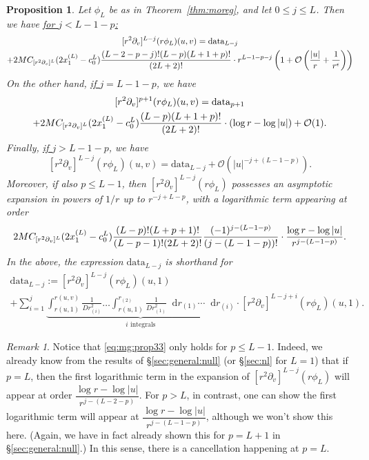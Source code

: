 \documentclass[11pt,english]{article}
\numberwithin{equation}{section}
\theoremstyle{remark}
\newtheorem{rem}{Remark}[section]
\theoremstyle{plain}
\newtheorem{prop}{Proposition}[section]
\theoremstyle{remark}
\newcommand{\dd}{\mathop{}\!\mathrm{d}}
\newcommand{\pv}{\partial_v}
\renewcommand{\(}{\left(}
\renewcommand{\)}{\right)}
\begin{document}
\begin{prop}\label{prop:prop.10.3}
Let $\phi_L$ be as in Theorem~\ref{thm:moreg}, and let $0\leq j\leq L$. Then we have \underline{for $j<L-1-p$:}
\begin{multline}\label{eq:mg:prop31}
[r^2\pv]^{L-j}(r\phi_L)(u,v)=\mathrm{data}_{L-j}\\
+2M\cv{L}(2x_1^{(L)}-c_0^L)\frac{(L-2-p-j)!(L-p)(L+1+p)!}{(2L+2)!}\cdot r^{L-1-p-j}\left(1+\mathcal{O}\left(\frac{|u|}{r}+\frac{1}{r^{\epsilon}}\right)\right) %
\end{multline}
On the other hand, \underline{if $j=L-1-p$}, we have
\begin{multline}\label{eq:mg:prop31.5}
[r^2\pv]^{p+1}(r\phi_L)(u,v)=\mathrm{data}_{p+1}\\
+2M\cv{L}(2x_1^{(L)}-c_0^L)\frac{(L-p)(L+1+p)!}{(2L+2)!}\cdot (\log r-\log|u|) +\mathcal O(1).
\end{multline}
Finally, \underline{if $j>L-1-p$}, we have
\begin{equation}\label{eq:mg:prop32}
[r^2\pv]^{L-j}(r\phi_L)(u,v)=\mathrm{data}_{L-j}+\mathcal O(|u|^{-j+(L-1-p)}).
\end{equation} Moreover, if also $p\leq L-1$, then $[r^2\pv]^{L-j}(r\phi_L)$ possesses an asymptotic expansion in powers of $1/r$ up to $r^{-j+L-p}$, with a logarithmic term appearing at order
\begin{equation}\label{eq:mg:prop33}
2M\cv{L}(2x_1^{(L)}-c_0^L)\frac{(L-p)!(L+p+1)!}{(L-p-1)!(2L+2)!}\frac{(-1)^{j-(L-1-p)}}{(j-(L-1-p))!}\cdot\frac{\log r-\log|u|}{r^{j-(L-1-p)}}.
\end{equation}
In the above, the expression $\mathrm{data}_{L-j}$ is shorthand for
\begin{multline}\label{eq:mg:prop34}
\mathrm{data}_{L-j}:=[r^2\pv]^{L-j}(r\phi_L)(u,1)\\
+\sum_{i=1}^j 
\underbrace{\int_{r(u,1)}^{r(u,v)}\frac{1}{Dr_{(i)}^2}\dots\int_{r(u,1)}^{r_{(2)}}\frac{1}{Dr_{(1)}^2}\dd r_{(1)}\cdots\dd r_{(i)}}_{i \text{ integrals}}\cdot[r^2\pv]^{L-j+i}(r\phi_L)(u,1).
\end{multline}
\end{prop}
\begin{rem}
Notice that \eqref{eq:mg:prop33} only holds for $p\leq L-1$. 
Indeed, we already know from the results of \S \ref{sec:general:null} (or \S \ref{sec:nl} for $L=1$) that if $p=L$, then the first logarithmic term in the expansion of $[r^2\pv]^{L-j}(r\phi_L)$ will appear at order $\dfrac{\log r-\log|u|}{r^{j-(L-2-p)}}$.
 For $p>L$, in contrast, one can show the first logarithmic term will appear at $\dfrac{\log r-\log|u|}{r^{j-(L-1-p)}}$, although we won't show this here. 
 (Again, we have in fact already shown this for $p=L+1$ in \S \ref{sec:general:null}.) 
 In this sense, there is a cancellation happening at $p=L$.
\end{rem}
\end{document}
